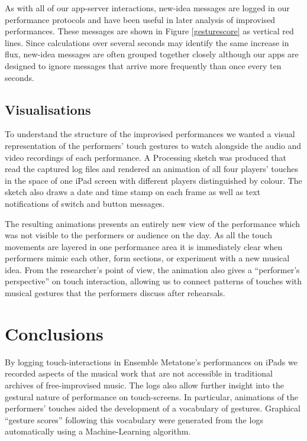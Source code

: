 \documentclass[graybox]{svmult}
\begin{document}
As with all of our app-server interactions, new-idea messages are
logged in our performance protocols and have been useful in later
analysis of improvised performances. These messages are shown in
Figure \ref{gesturescore} as vertical red lines. Since calculations
over several seconds may identify the same increase in flux, new-idea
messages are often grouped together closely although our apps are
designed to ignore messages that arrive more frequently than once
every ten seconds. 

\subsection{Visualisations}
\label{subsec:visualisations}

To understand the structure of the improvised performances we wanted a
visual representation of the performers' touch gestures to watch
alongside the audio and video recordings of each performance. A
Processing sketch was produced that read the captured log files and
rendered an animation of all four players' touches in the space of one
iPad screen with different players distinguished by colour. The sketch
also draws a date and time stamp on each frame as well as text
notifications of switch and button messages.

The resulting animations presents an entirely new view of the
performance which was not visible to the performers or audience on the
day. As all the touch movements are layered in one performance area it
is immediately clear when performers mimic each other, form sections,
or experiment with a new musical idea. From the researcher's point of
view, the animation also gives a ``performer's perspective'' on touch
interaction, allowing us to connect patterns of touches with musical
gestures that the performers discuss after rehearsals.



\section{Conclusions}

By logging touch-interactions in Ensemble Metatone's performances on
iPads we recorded aspects of the musical work that are not accessible
in traditional archives of free-improvised music. The logs also allow
further insight into the gestural nature of performance on
touch-screens. In particular, animations of the performers' touches
aided the development of a vocabulary of gestures. Graphical ``gesture
scores'' following this vocabulary were generated from the logs
automatically using a Machine-Learning algorithm.
\end{document}
